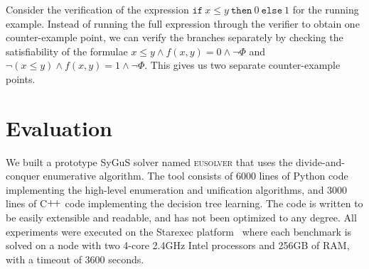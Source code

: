 \documentclass{llncs}
\newcommand\Spec{\Phi}
\newcommand\ITE[3]{\mathtt{if}~#1~\mathtt{then}~#2~\mathtt{else}~#3}
\newcommand{\sygus}{{\sffamily\fontsize{8.5}{10}\selectfont
    SyGuS}\xspace}
\newcommand{\eusolver}{\textsc{eusolver}\xspace}
\begin{document}
\vspace*{-2mm}
\begin{example}
  Consider the verification of the expression $\ITE{x \leq y}{0}{1}$
  for the running example.
  Instead of running the full expression through the verifier to
  obtain one counter-example point, we can verify the branches
  separately by checking the satisfiability of the formulae $x \leq y
  \wedge f(x, y) = 0 \wedge \neg \Spec$ and $\neg (x \leq y) \wedge f(x,
  y) = 1 \wedge \neg \Spec$.
  This gives us two separate counter-example points.
\end{example}

\vspace{-3ex}
\section{Evaluation}
\label{sec:evaluation}
% 
% 

We built a prototype \sygus solver named \eusolver that uses the
divide-and-conquer enumerative algorithm.
The tool consists of 6000 lines of Python code implementing the
high-level enumeration and unification algorithms, and 3000 lines of
C$\raisebox{1pt}{+\!+}$ code implementing the decision tree learning.
The code is written to be easily extensible and readable, and has not
been optimized to any degree.
All experiments were executed on the Starexec platform~\cite{starexec}
where each benchmark is solved on a node with two 4-core
2.4GHz Intel processors and 256GB of RAM, with a timeout of $3600$
seconds.

\solvedData
\end{document}
